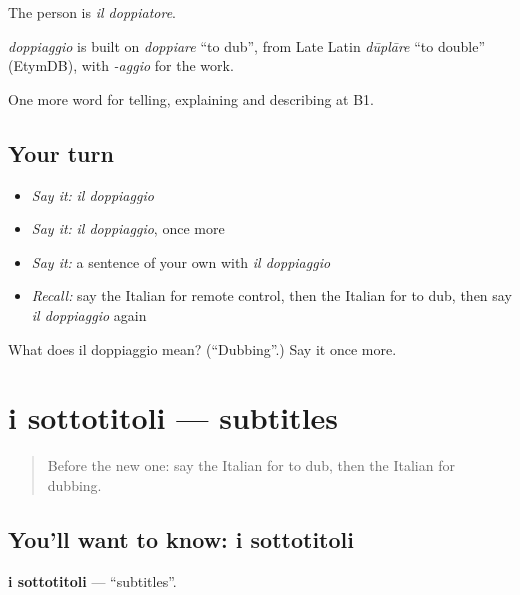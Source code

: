 The person is \emph{il doppiatore}.

\begin{cousinweb}
\emph{doppiaggio} is built on \emph{doppiare} \textquotedblleft{}to dub\textquotedblright{}, from Late Latin \emph{dūplāre} \textquotedblleft{}to double\textquotedblright{} (EtymDB), with \emph{-aggio} for the work.
\end{cousinweb}

\begin{grammarlens}[title={What you've built}]
One more word for telling, explaining and describing at B1.
\end{grammarlens}

\subsection*{Your turn}
\begin{itemize}
\raggedright
  \item \emph{Say it:} \emph{il doppiaggio}
  \item \emph{Say it:} \emph{il doppiaggio}, once more
  \item \emph{Say it:} a sentence of your own with \emph{il doppiaggio}
  \item \emph{Recall:} say the Italian for remote control, then the Italian for to dub, then say \emph{il doppiaggio} again
\end{itemize}

\begin{tcolorbox}[breakable,colback=teal!4,colframe=teal!35!black,title={Before you move on}]
What does il doppiaggio mean? (\textquotedblleft{}Dubbing\textquotedblright{}.) Say it once more.
\end{tcolorbox}
\section[i sottotitoli]{i sottotitoli — subtitles}

\label{lesson:IT-C529-sottotitoli}



\begin{quote}
Before the new one: say the Italian for to dub, then the Italian for dubbing.
\end{quote}

\subsection*{You'll want to know: i sottotitoli}
\textbf{i sottotitoli} — \textquotedblleft{}subtitles\textquotedblright{}.

